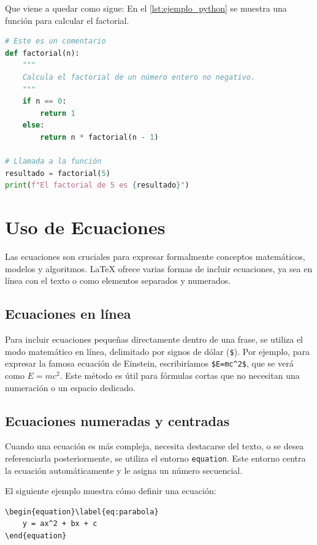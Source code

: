 \documentclass[11pt,a4paper]{book}
\begin{document}
Que viene a quedar como sigue: En el \autoref{lst:ejemplo_python} se muestra una función para calcular el factorial.

\begin{lstlisting}[language=Python, caption={Ejemplo de un listado de código en Python.}, label={lst:ejemplo_python}]
# Este es un comentario
def factorial(n):
    """
    Calcula el factorial de un número entero no negativo.
    """
    if n == 0:
        return 1
    else:
        return n * factorial(n - 1)

# Llamada a la función
resultado = factorial(5)
print(f"El factorial de 5 es {resultado}")
\end{lstlisting}

\section{Uso de Ecuaciones}
Las ecuaciones son cruciales para expresar formalmente conceptos matemáticos, modelos y algoritmos. LaTeX ofrece varias formas de incluir ecuaciones, ya sea en línea con el texto o como elementos separados y numerados.

\subsection{Ecuaciones en línea}
Para incluir ecuaciones pequeñas directamente dentro de una frase, se utiliza el modo matemático en línea, delimitado por signos de dólar (\verb|$|). Por ejemplo, para expresar la famosa ecuación de Einstein, escribiríamos \verb|$E=mc^2$|, que se verá como $E=mc^2$. Este método es útil para fórmulas cortas que no necesitan una numeración o un espacio dedicado.

\subsection{Ecuaciones numeradas y centradas}
Cuando una ecuación es más compleja, necesita destacarse del texto, o se desea referenciarla posteriormente, se utiliza el entorno \texttt{equation}. Este entorno centra la ecuación automáticamente y le asigna un número secuencial.

El siguiente ejemplo muestra cómo definir una ecuación:
\begin{verbatim}
\begin{equation}\label{eq:parabola}
    y = ax^2 + bx + c
\end{equation}
\end{verbatim}
\end{document}
